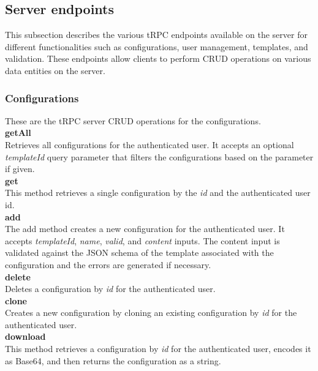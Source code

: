 \newpage

\subsection{Server endpoints}

This subsection describes the various tRPC endpoints available on the server for different functionalities such as configurations, user management, templates, and validation. These endpoints allow clients to perform CRUD operations on various data entities on the server.

\subsubsection{Configurations}

These are the tRPC server CRUD operations for the configurations. \\

\noindent
\textbf{getAll} \\
Retrieves all configurations for the authenticated user. It accepts an optional \textit{templateId} query parameter that filters the configurations based on the parameter if given. \\

\noindent
\textbf{get} \\
This method retrieves a single configuration by the \textit{id} and the authenticated user id. \\

\noindent
\textbf{add} \\
The add method creates a new configuration for the authenticated user. It accepts \textit{templateId}, \textit{name}, \textit{valid}, and \textit{content} inputs. The content input is validated against the JSON schema of the template associated with the configuration and the errors are generated if necessary. \\

\noindent
\textbf{delete} \\
Deletes a configuration by \textit{id} for the authenticated user. \\

\noindent
\textbf{clone} \\
Creates a new configuration by cloning an existing configuration by \textit{id} for the authenticated user. \\

\noindent
\textbf{download} \\
This method retrieves a configuration by \textit{id} for the authenticated user, encodes it as Base64, and then returns the configuration as a string. \\

